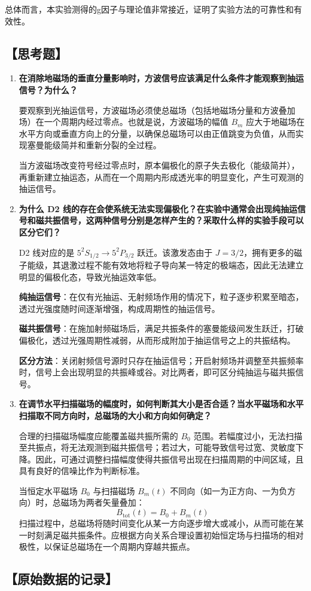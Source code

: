 \documentclass[12pt,a4paper,UTF8]{ctexart}
\begin{document}
总体而言，本实验测得的g因子与理论值非常接近，证明了实验方法的可靠性和有效性。

\subsection*{【思考题】}
\begin{enumerate}
  \item \textbf{在消除地磁场的垂直分量影响时，方波信号应该满足什么条件才能观察到抽运信号？为什么？}

  要观察到光抽运信号，方波磁场必须使总磁场（包括地磁场分量和方波叠加场）在一个周期内经过零点。也就是说，方波磁场的幅值 $B_m$ 应大于地磁场在水平方向或垂直方向上的分量，以确保总磁场可以由正值跳变为负值，从而实现塞曼能级简并和重新分裂的全过程。

  当方波磁场改变符号经过零点时，原本偏极化的原子失去极化（能级简并），再重新建立抽运态，从而在一个周期内形成透光率的明显变化，产生可观测的抽运信号。\cite{wu1999modernexp,zheng1988modernexp,he2003modernexp,wu1999scienceexp,lin1999tutorial}

  \vspace{0.5em}

  \item \textbf{为什么 D2 线的存在会使系统无法实现偏极化？在实验中通常会出现纯抽运信号和磁共振信号，这两种信号分别是怎样产生的？采取什么样的实验手段可以区分它们？}

  D2 线对应的是 $5^2S_{1/2} \rightarrow 5^2P_{3/2}$ 跃迁。该激发态由于 $J = 3/2$，拥有更多的磁子能级，其退激过程不能有效地将粒子导向某一特定的极端态，因此无法建立明显的偏极化态，导致光抽运效率低。

  \textbf{纯抽运信号}：在仅有光抽运、无射频场作用的情况下，粒子逐步积累至暗态，透过光强度随时间逐渐增强，构成周期性的抽运信号。

  \textbf{磁共振信号}：在施加射频磁场后，满足共振条件的塞曼能级间发生跃迁，打破偏极化，透过光强周期性减弱，从而形成附加于抽运信号之上的共振结构。

  \textbf{区分方法}：关闭射频信号源时只存在抽运信号；开启射频场并调整至共振频率时，信号上会出现明显的共振峰或谷。对比两者，即可区分纯抽运与磁共振信号。

  \vspace{0.5em}

  \item \textbf{在调节水平扫描磁场的幅度时，如何判断其大小是否合适？当水平磁场和水平扫描取不同方向时，总磁场的大小和方向如何确定？}

  合理的扫描磁场幅度应能覆盖磁共振所需的 $B_0$ 范围。若幅度过小，无法扫描至共振点，将无法观测到磁共振信号；若过大，可能导致信号过宽、灵敏度下降。因此，可通过调整扫描幅度使得共振信号出现在扫描周期的中间区域，且具有良好的信噪比作为判断标准。

  当恒定水平磁场 $B_0$ 与扫描磁场 $B_m(t)$ 不同向（如一为正方向、一为负方向）时，总磁场为两者矢量叠加：
  \[
  B_{\text{tot}}(t) = B_0 + B_m(t)
  \]
  扫描过程中，总磁场将随时间变化从某一方向逐步增大或减小，从而可能在某一时刻满足磁共振条件。应根据方向关系合理设置初始恒定场与扫描场的相对极性，以保证总磁场在一个周期内穿越共振点。
\end{enumerate}




\subsection*{【原始数据的记录】}

\end{document}
